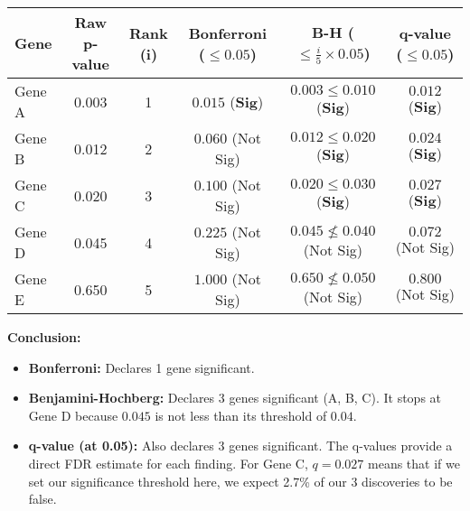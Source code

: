 \documentclass{article}
\begin{document}
\begin{tabular}{l|c|cccc}
\hline
\textbf{Gene} & \textbf{Raw p-value} & \textbf{Rank (i)} & \textbf{Bonferroni ($\le 0.05$)} & \textbf{B-H ($\le \frac{i}{5} \times 0.05$)} & \textbf{q-value ($\le 0.05$)} \\
\hline
Gene A & 0.003 & 1 & $0.015$ (\textbf{Sig}) & $0.003 \le 0.010$ (\textbf{Sig}) & $0.012$ (\textbf{Sig}) \\
Gene B & 0.012 & 2 & $0.060$ (Not Sig) & $0.012 \le 0.020$ (\textbf{Sig}) & $0.024$ (\textbf{Sig}) \\
Gene C & 0.020 & 3 & $0.100$ (Not Sig) & $0.020 \le 0.030$ (\textbf{Sig}) & $0.027$ (\textbf{Sig}) \\
Gene D & 0.045 & 4 & $0.225$ (Not Sig) & $0.045 \not\le 0.040$ (Not Sig) & $0.072$ (Not Sig) \\
Gene E & 0.650 & 5 & $1.000$ (Not Sig) & $0.650 \not\le 0.050$ (Not Sig) & $0.800$ (Not Sig) \\
\hline
\end{tabular}

\textbf{Conclusion:}
\begin{itemize}
    \item \textbf{Bonferroni:} Declares 1 gene significant.
    \item \textbf{Benjamini-Hochberg:} Declares 3 genes significant (A, B, C). It stops at Gene D because $0.045$ is not less than its threshold of $0.04$.
    \item \textbf{q-value (at 0.05):} Also declares 3 genes significant. The q-values provide a direct FDR estimate for each finding. For Gene C, $q=0.027$ means that if we set our significance threshold here, we expect 2.7\% of our 3 discoveries to be false.
\end{itemize}
\end{document}
